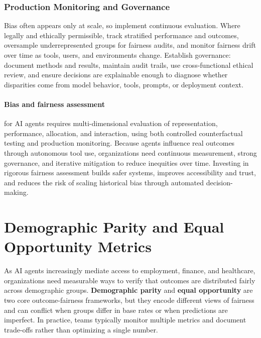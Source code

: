 \begin{TNtwocol}
\subsubsection*{Production Monitoring and Governance}
Bias often appears only at scale, so implement continuous evaluation. Where legally and ethically permissible, track stratified performance and outcomes, oversample underrepresented groups for fairness audits, and monitor fairness drift over time as tools, users, and environments change. Establish governance: document methods and results, maintain audit trails, use cross-functional ethical review, and ensure decisions are explainable enough to diagnose whether disparities come from model behavior, tools, prompts, or deployment context.

\paragraph{Bias and fairness assessment} for AI agents requires multi-dimensional evaluation of representation, performance, allocation, and interaction, using both controlled counterfactual testing and production monitoring. Because agents influence real outcomes through autonomous tool use, organizations need continuous measurement, strong governance, and iterative mitigation to reduce inequities over time. Investing in rigorous fairness assessment builds safer systems, improves accessibility and trust, and reduces the risk of scaling historical bias through automated decision-making.

\section{Demographic Parity and Equal Opportunity Metrics}

As AI agents increasingly mediate access to employment, finance, and healthcare, organizations need measurable ways to verify that outcomes are distributed fairly across demographic groups. \textbf{Demographic parity} and \textbf{equal opportunity} are two core outcome-fairness frameworks, but they encode different views of fairness and can conflict when groups differ in base rates or when predictions are imperfect. In practice, teams typically monitor multiple metrics and document trade-offs rather than optimizing a single number.


\end{TNtwocol}

